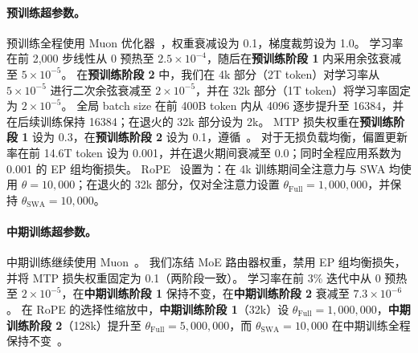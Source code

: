 \paragraph{预训练超参数。}
预训练全程使用 Muon 优化器~\cite{jordan2024muon}，权重衰减设为 0.1，梯度裁剪设为 1.0。
学习率在前 2{,}000 步线性从 0 预热至 $2.5\times10^{-4}$，随后在\textbf{预训练阶段 1} 内采用余弦衰减至 $5\times10^{-5}$。
在\textbf{预训练阶段 2} 中，我们在 4k 部分（2T token）对学习率从 $5\times10^{-5}$ 进行二次余弦衰减至 $2\times10^{-5}$，并在 32k 部分（1T token）将学习率固定为 $2\times10^{-5}$。
全局 batch size 在前 400B token 内从 4096 逐步提升至 16384，并在后续训练保持 16384；在退火的 32k 部分设为 2k。
MTP 损失权重在\textbf{预训练阶段 1} 设为 0.3，在\textbf{预训练阶段 2} 设为 0.1，遵循~\cite{deepseek2024deepseekv3}。
对于无损负载均衡，偏置更新率在前 14.6T token 设为 0.001，并在退火期间衰减至 0.0；同时全程应用系数为 0.001 的 EP 组均衡损失。
RoPE~\cite{su2024roformer} 设置为：在 4k 训练期间全注意力与 SWA 均使用 $\theta=10{,}000$；在退火的 32k 部分，仅对全注意力设置 $\theta_{\mathrm{Full}}=1{,}000{,}000$，并保持 $\theta_{\mathrm{SWA}}=10{,}000$。

\paragraph{中期训练超参数。}
中期训练继续使用 Muon~\cite{jordan2024muon}。
我们冻结 MoE 路由器权重，禁用 EP 组均衡损失，并将 MTP 损失权重固定为 0.1（两阶段一致）。
学习率在前 3\% 迭代中从 0 预热至 $2\times10^{-5}$，在\textbf{中期训练阶段 1} 保持不变，在\textbf{中期训练阶段 2} 衰减至 $7.3\times10^{-6}$。
在 RoPE 的选择性缩放中，\textbf{中期训练阶段 1}（32k）设 $\theta_{\mathrm{Full}}=1{,}000{,}000$，\textbf{中期训练阶段 2}（128k）提升至 $\theta_{\mathrm{Full}}=5{,}000{,}000$，而 $\theta_{\mathrm{SWA}}=10{,}000$ 在中期训练全程保持不变~\cite{xiong2024effective}。


